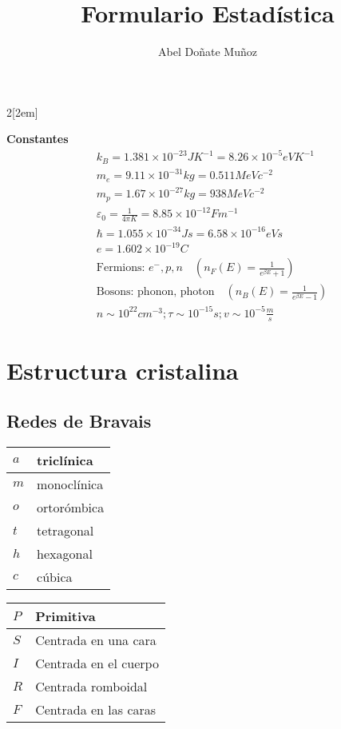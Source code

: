 \documentclass[leqno]{article}
\title{Formulario Estadística}
\author{Abel Doñate Muñoz}
\date{}
\begin{document}
\begin{multicols}{2}[\columnsep2em]

\textbf{Constantes}
\begin{align*}
&k_B = 1.381\times 10^{-23}JK^{-1} = 8.26\times 10^{-5}eVK^{-1}\\
&m_e = 9.11\times 10^{-31}kg = 0.511MeVc^{-2}\\
&m_p = 1.67\times 10^{-27}kg = 938MeVc^{-2}\\
&\varepsilon _0 = \frac{1}{4\pi K} = 8.85\times 10^{-12} Fm^{-1}\\
&\hbar = 1.055\times 10^{-34} Js = 6.58\times 10^{-16}eVs \\
&e = 1.602 \times 10^{-19} C\\
&\text{Fermions: }e^-, p, n \quad (n_F(E) = \frac{1}{e ^{\beta E}+1})\\
& \text{Bosons: phonon, photon} \quad (n_B(E)=\frac{1}{e ^{\beta E} -1})\\
& n\sim 10 ^{22}cm ^{-3}; \tau \sim 10 ^{-15}s; v\sim 10 ^{-5}\frac{m}{s}
\end{align*}



\section{Estructura cristalina}
\subsection{Redes de Bravais}
\begin{minipage}{0.45\columnwidth}
\begin{center}
\begin{tabular}{|l|l|}
\hline
$a$ & triclínica  \\ \hline
$m$ & monoclínica\\ \hline
$o$ & ortorómbica\\ \hline
$t$ & tetragonal \\ \hline
$h$ & hexagonal\\ \hline
$c$ & cúbica \\ \hline
\end{tabular}
\end{center}
\end{minipage}
\begin{minipage}{0.45\columnwidth}
\begin{center}
\begin{tabular}{|l|l|}
\hline
$P$ & Primitiva \\\hline
$S$ & Centrada en una cara\\\hline
$I$ & Centrada en el cuerpo\\\hline
$R$ & Centrada romboidal\\\hline
$F$ & Centrada en las caras \\\hline
\end{tabular}
\end{center}
\end{minipage}


\end{multicols}
\end{document}
